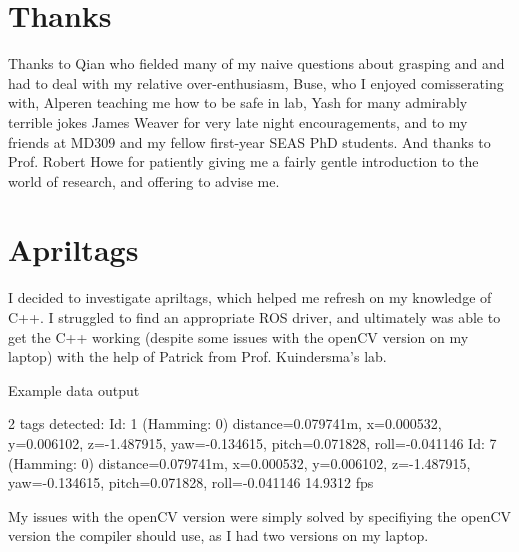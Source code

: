 \documentclass[preprint,12pt,3p]{elsarticle}
\begin{document}
\section{Thanks}

Thanks to Qian who fielded many of my naive questions about grasping and and had to deal with my relative
over-enthusiasm, Buse, who I enjoyed comisserating with, Alperen teaching me how to be safe in lab,
Yash for many admirably terrible jokes James Weaver for very late night encouragements, and to
my friends at MD309 and my fellow first-year SEAS PhD students.  And thanks to Prof. Robert Howe for 
patiently giving me a fairly gentle introduction to the world of research, and offering to advise
me.


\newpage

\clearpage
\vspace*{\fill}
\begin{center}
\begin{minipage}{.6\textwidth}
\Huge
{}
\normalsize
\end{minipage}
\end{center}
\vfill %
\clearpage

\appendix

\section{Apriltags}
I decided to investigate apriltags, which helped me refresh on my knowledge of C++. I struggled to
find an appropriate ROS driver, and ultimately was able to get the C++ working (despite some issues
with the openCV version on my laptop) with the help of Patrick from Prof. Kuindersma's lab.

Example data output
\begin{ttlisting}
2 tags detected: 
Id: 1 (Hamming: 0) distance=0.079741m, x=0.000532, y=0.006102, z=-1.487915, yaw=-0.134615, pitch=0.071828, roll=-0.041146
Id: 7 (Hamming: 0) distance=0.079741m, x=0.000532, y=0.006102, z=-1.487915, yaw=-0.134615, pitch=0.071828, roll=-0.041146
14.9312 fps
\end{ttlisting}

My issues with the openCV version were simply solved by specifiying the openCV
version the compiler should use, as I had two versions on my laptop.

\end{document}
